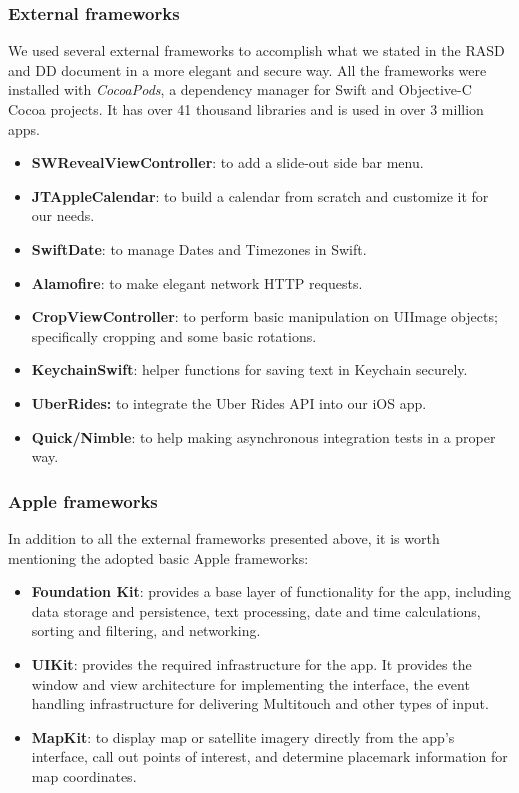 \subsubsection{External frameworks}
We used several external frameworks to accomplish what we stated in the RASD and DD document in a more elegant and secure way.
All the frameworks were installed with \textit{CocoaPods}, a dependency manager for Swift and Objective-C Cocoa projects. It has over 41 thousand libraries and is used in over 3 million apps.
\begin{itemize}
	\item \textbf{SWRevealViewController}: to add a slide-out side bar menu.
	\item \textbf{JTAppleCalendar}: to build a calendar from scratch and customize it for our needs.
	\item \textbf{SwiftDate}: to manage Dates and Timezones in Swift.
	\item \textbf{Alamofire}: to make elegant network HTTP requests.
	\item \textbf{CropViewController}: to perform basic manipulation on UIImage objects; specifically cropping and some basic rotations.
	\item \textbf{KeychainSwift}: helper functions for saving text in Keychain securely.
	\item \textbf{UberRides:} to integrate the Uber Rides API into our iOS app.
	\item \textbf{Quick/Nimble}: to help making asynchronous integration tests in a proper way.
\end{itemize}

\subsubsection{Apple frameworks}
In addition to all the external frameworks presented above, it is worth mentioning the adopted basic Apple frameworks:

\begin{itemize}
	\item \textbf{Foundation Kit}: provides a base layer of functionality for the app, including data storage and persistence, text processing, date and time calculations, sorting and filtering, and networking.
	\item \textbf{UIKit}: provides the required infrastructure for the app. It provides the window and view architecture for implementing the interface, the event handling infrastructure for delivering Multitouch and other types of input.
	\item  \textbf{MapKit}: to display map or satellite imagery directly from the app's interface, call out points of interest, and determine placemark information for map coordinates.
\end{itemize}

